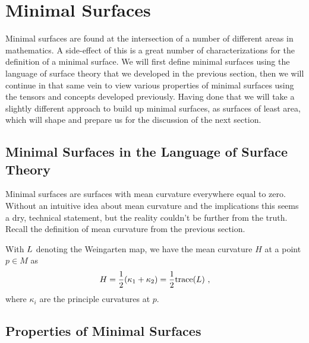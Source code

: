 \section{Minimal Surfaces}

Minimal surfaces are found at the intersection of a number of different areas in mathematics. A side-effect of this is a great number of characterizations for the definition of a minimal surface. We will first define minimal surfaces using the language of surface theory that we developed in the previous section, then we will continue in that same vein to view various properties of minimal surfaces using the tensors and concepts developed previously. Having done that we will take a slightly different approach to build up minimal surfaces, as surfaces of least area, which will shape and prepare us for the discussion of the next section.

\subsection{Minimal Surfaces in the Language of Surface Theory}

Minimal surfaces are surfaces with mean curvature everywhere equal to zero. Without an intuitive idea about mean curvature and the implications this seems a dry, technical statement, but the reality couldn't be further from the truth. Recall the definition of mean curvature from the previous section.

With $L$ denoting the Weingarten map, we have the mean curvature $H$ at a point $p \in M$ as
\[
  H = \frac{1}{2} (\kappa_1 + \kappa_2) =  \frac{1}{2}\text{trace}(L) \ ,
\]
where $\kappa_i$ are the principle curvatures at $p$.





\subsection{Properties of Minimal Surfaces}




